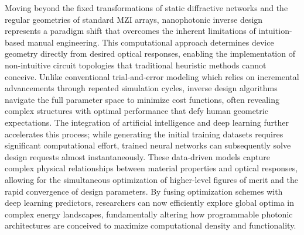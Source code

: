Moving beyond the fixed transformations of static diffractive networks and the regular geometries of standard MZI arrays, nanophotonic inverse design represents a paradigm shift that overcomes the inherent limitations of intuition-based manual engineering. \citep{doi_10_1088_1361_6633_ae7f9a_e05f9b1d} \citep{doi_10_1109_icufn61752_2024_10625552_985a60f2} This computational approach determines device geometry directly from desired optical responses, enabling the implementation of non-intuitive circuit topologies that traditional heuristic methods cannot conceive. Unlike conventional trial-and-error modeling which relies on incremental advancements through repeated simulation cycles, inverse design algorithms navigate the full parameter space to minimize cost functions, often revealing complex structures with optimal performance that defy human geometric expectations. The integration of artificial intelligence and deep learning further accelerates this process; while generating the initial training datasets requires significant computational effort, trained neural networks can subsequently solve design requests almost instantaneously. These data-driven models capture complex physical relationships between material properties and optical responses, allowing for the simultaneous optimization of higher-level figures of merit and the rapid convergence of design parameters. By fusing optimization schemes with deep learning predictors, researchers can now efficiently explore global optima in complex energy landscapes, fundamentally altering how programmable photonic architectures are conceived to maximize computational density and functionality. \citep{doi_10_1515_nanoph_2021_0660_2d91a441} \citep{doi_10_1515_nanoph_2018_0183_d85e9193}

